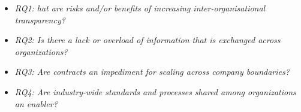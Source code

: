 \begin{itemize}
\item {\em RQ1:  hat are risks and/or benefits of increasing inter-organisational transparency?}
\item {\em RQ2: Is there a lack or overload of information that is exchanged across organizations?} 
\item {\em RQ3: Are contracts an impediment for scaling  across company boundaries?} %
\item {\em RQ4: Are industry-wide standards and processes shared among organizations an enabler?}
\end{itemize}

